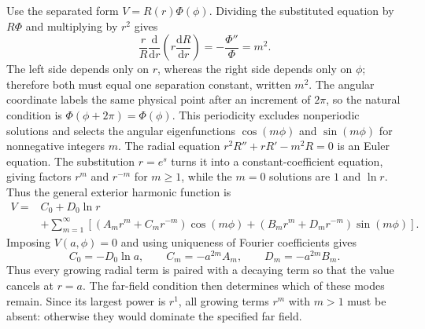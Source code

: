 Use the separated form $V=R(r)\Phi(\phi)$. Dividing the substituted equation by $R\Phi$ and multiplying by $r^2$ gives
\begin{equation}
\frac{r}{R}\frac{\mathrm{d}}{\mathrm{d}r}\left(r\frac{\mathrm{d}R}{\mathrm{d}r}\right)
=-\frac{\Phi''}{\Phi}=m^2.
\end{equation}
The left side depends only on $r$, whereas the right side depends only on $\phi$; therefore both must equal one separation constant, written $m^2$. The angular coordinate labels the same physical point after an increment of $2\pi$, so the natural condition is $\Phi(\phi+2\pi)=\Phi(\phi)$. This periodicity excludes nonperiodic solutions and selects the angular eigenfunctions $\cos(m\phi)$ and $\sin(m\phi)$ for nonnegative integers $m$. The radial equation $r^2R''+rR'-m^2R=0$ is an Euler equation. The substitution $r=e^s$ turns it into a constant-coefficient equation, giving factors $r^m$ and $r^{-m}$ for $m\geq1$, while the $m=0$ solutions are $1$ and $\ln r$. Thus the general exterior harmonic function is
\begin{equation}
\begin{aligned}
V={}&C_0+D_0\ln r\\
&+\sum_{m=1}^{\infty}\left[
\left(A_mr^m+C_mr^{-m}\right)\cos(m\phi)
+\left(B_mr^m+D_mr^{-m}\right)\sin(m\phi)\right].
\end{aligned}
\end{equation}
Imposing $V(a,\phi)=0$ and using uniqueness of Fourier coefficients gives
\begin{equation}
C_0=-D_0\ln a,\qquad C_m=-a^{2m}A_m,
\qquad D_m=-a^{2m}B_m.
\end{equation}
Thus every growing radial term is paired with a decaying term so that the value cancels at $r=a$. The far-field condition then determines which of these modes remain. Since its largest power is $r^1$, all growing terms $r^m$ with $m>1$ must be absent: otherwise they would dominate the specified far field.

